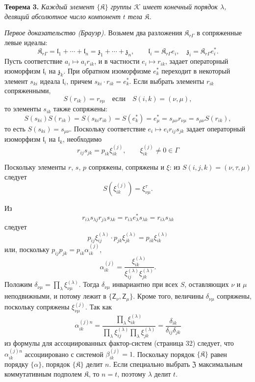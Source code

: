 \documentclass[11pt]{article}
\begin{document}
\textbf{Теорема 3.} \emph{Каждый элемент \(\{\mathfrak K\}\) группы \(\mathscr K\) имеет конечный порядок \(\lambda\), делящий абсолютное число компонент \(t\) тела \(\mathfrak K\).}

\emph{Первое доказательство (Брауэр).} Возьмем два разложения \(\mathfrak K_{r\Gamma}\) в сопряженные левые идеалы:
\[
\mathfrak K_{r\Gamma}=\mathfrak l_1+\cdots+\mathfrak l_n=\mathfrak z_1+\cdots+\mathfrak z_n,\qquad
\mathfrak l_i=\mathfrak K_{r\Gamma}e_i,\quad
\mathfrak z_i=\mathfrak K_{r\Gamma}e_i^*.
\]
Пусть соответствие \(a_i\mapsto a_ir_{ik}\), и в частности \(e_i\mapsto r_{ik}\), задает операторный изоморфизм \(\mathfrak l_i\) на \(\mathfrak z_k\). При обратном изоморфизме \(e_k^*\) переходит в некоторый элемент \(s_{ki}\) идеала \(\mathfrak l_i\), причем \(s_{ki}\cdot r_{ik}=e_k^*\). Если выбрать элементы \(r_{ik}\) сопряженными,
\[
S(r_{ik})=r_{\nu\mu}\quad\text{если}\quad S(i,k)=(\nu,\mu),
\]
то элементы \(s_{ik}\) также сопряжены:
\[
S(s_{ki})S(r_{ik})=S(s_{ki}r_{ik})=S(e_k^*)=e_\mu^*
=s_{\mu\nu}r_{\nu\mu}=s_{\mu\nu}S(r_{ik}),
\]
то есть \(S(s_{ki})=s_{\mu\nu}\). Поскольку соответствие \(e_i\mapsto e_ir_{ij}s_{jk}\) задает операторный изоморфизм \(\mathfrak l_i\) на \(\mathfrak l_k\), необходимо
\[
r_{ij}s_{jk}=p_{ik}\xi_{ik}^{(j)},\qquad
\xi_{ik}^{(j)}\ne0\in\Gamma
\]

Поскольку элементы \(r\), \(s\), \(p\) сопряжены, сопряжены и \(\xi\): из \(S(i,j,k)=(\nu,\tau,\mu)\) следует
\[
S(\xi_{ik}^{(j)})=\xi_{\nu\mu}^{\tau}.
\]

Из
\[
r_{i\lambda}s_{\lambda j}r_{j\lambda}s_{\lambda k}
=r_{i\lambda}e_\lambda^*s_{\lambda k}
=r_{i\lambda}s_{\lambda k}
\]
следует
\[
p_{ij}\xi_{ij}^{(\lambda)}\cdot p_{jk}\xi_{jk}^{(\lambda)}
=p_{ik}\xi_{ik}^{(\lambda)}
\]
или, поскольку \(p_{ij}p_{jk}=p_{ik}\alpha_{ik}^{(j)}\),
\[
\alpha_{ik}^{(j)}
=\frac{\xi_{ik}^{(\lambda)}}{\xi_{ij}^{(\lambda)}\xi_{jk}^{(\lambda)}}.
\]
Положим \(\delta_{\nu\mu}=\prod_{\lambda}\xi_{\nu\mu}^{(\lambda)}\). Тогда \(\delta_{\nu\mu}\) инвариантно при всех \(S\), оставляющих \(\nu\) и \(\mu\) неподвижными, и потому лежит в \(\{\mathsf{Z}_\nu,\mathsf{Z}_\mu\}\). Кроме того, величины \(\delta_{\nu\mu}\) сопряжены, поскольку сопряжены \(\xi_{\nu\mu}^{(j)}\). Так как
\[
\alpha_{ik}^{(j)n}
=\frac{\prod_{\lambda}\xi_{ik}^{(\lambda)}}
       {\prod_{\lambda}\xi_{ij}^{(\lambda)}\prod_{\lambda}\xi_{jk}^{(\lambda)}}
=\frac{\delta_{ik}}{\delta_{ij}\delta_{jk}}
\]
из формулы для ассоциированных фактор-систем (страница 32) следует, что \(\alpha_{ik}^{(j)n}\) ассоциировано с системой \(\beta_{ik}^{(j)}=1\). Поскольку порядок \(\{\mathfrak K\}\) равен порядку \(\{\alpha\}\), порядок \(\{\mathfrak K\}\) делит \(n\). Если специально выбрать \(\mathfrak Z\) максимальным коммутативным подполем \(\mathfrak K\), то \(n=t\), поэтому \(\lambda\) делит \(t\).
\end{document}
